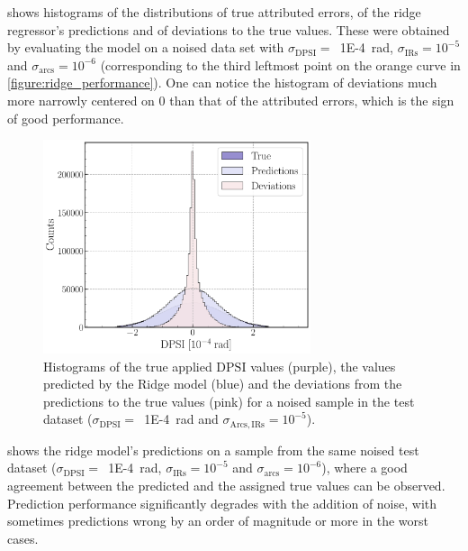  shows histograms of the distributions of true attributed errors, of the ridge regressor's predictions and of deviations to the true values.
These were obtained by evaluating the model on a noised data set with \(\sigma_{\mathrm{DPSI}} =\)~\qty{1E-4}{\radian}, \(\sigma_{\mathrm{IRs}} = 10^{-5}\) and \(\sigma_{\mathrm{arcs}} = 10^{-6}\) (corresponding to the third leftmost point on the \textcolor{mplorange}{orange} curve in \cref{figure:ridge_performance}).
One can notice the histogram of deviations much more narrowly centered on \num{0} than that of the attributed errors, which is the sign of good performance.

\begin{figure}[!htb]
    \centering
    \includegraphics*[width=0.7\textwidth]{Figures/ML_for_IR_Coupling/ridge_histograms.pdf}
    \caption{Histograms of the true applied \(\mathrm{DPSI}\) values (\textcolor{ridgepurple}{purple}), the values predicted by the Ridge model (\textcolor{ridgeblue}{blue}) and the deviations from the predictions to the true values (\textcolor{ridgesalmon}{pink}) for a noised sample in the test dataset (\(\sigma_{\mathrm{DPSI}} =\)~\qty{1E-4}{\radian} and \(\sigma_{\mathrm{Arcs, IRs}} = 10^{-5}\)).}
    \label{figure:ridge_histograms}
\end{figure}

 shows the ridge model's predictions on a sample from the same noised test dataset (\(\sigma_{\mathrm{DPSI}} =\)~\qty{1E-4}{\radian}, \(\sigma_{\mathrm{IRs}} = 10^{-5}\) and \(\sigma_{\mathrm{arcs}} = 10^{-6}\)), where a good agreement between the predicted and the assigned true values can be observed.
Prediction performance significantly degrades with the addition of noise, with sometimes predictions wrong by an order of magnitude or more in the worst cases.

